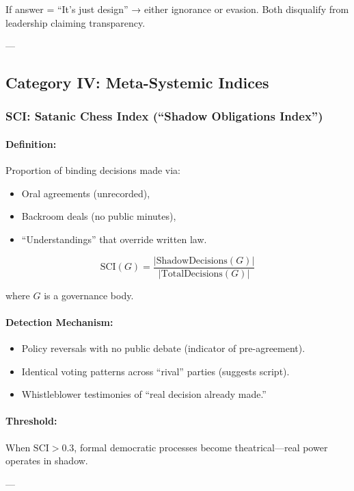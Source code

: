 \documentclass[11pt,a4paper]{article}
\theoremstyle{definition}
\theoremstyle{remark}
\begin{document}
If answer = ``It's just design'' → either ignorance or evasion. Both disqualify from leadership claiming transparency.

---

\subsection{Category IV: Meta-Systemic Indices}

\subsubsection{SCI: Satanic Chess Index (``Shadow Obligations Index'')}

\paragraph{Definition:}
Proportion of binding decisions made via:
\begin{itemize}
\item Oral agreements (unrecorded),
\item Backroom deals (no public minutes),
\item ``Understandings'' that override written law.
\end{itemize}

\[
\text{SCI}(G) = \frac{|\text{ShadowDecisions}(G)|}{|\text{TotalDecisions}(G)|}
\]

where $G$ is a governance body.

\paragraph{Detection Mechanism:}
\begin{itemize}
\item Policy reversals with no public debate (indicator of pre-agreement).
\item Identical voting patterns across ``rival'' parties (suggests script).
\item Whistleblower testimonies of ``real decision already made.''
\end{itemize}

\paragraph{Threshold:}
When $\text{SCI} > 0.3$, formal democratic processes become theatrical—real power operates in shadow.

---
\end{document}
